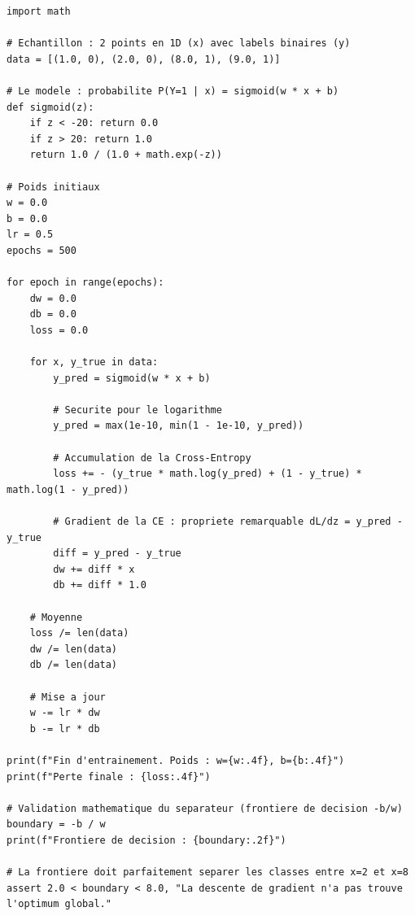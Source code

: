 \documentclass[11pt,a4paper]{article}
\begin{document}
\begin{lstlisting}
import math

# Echantillon : 2 points en 1D (x) avec labels binaires (y)
data = [(1.0, 0), (2.0, 0), (8.0, 1), (9.0, 1)]

# Le modele : probabilite P(Y=1 | x) = sigmoid(w * x + b)
def sigmoid(z):
    if z < -20: return 0.0
    if z > 20: return 1.0
    return 1.0 / (1.0 + math.exp(-z))

# Poids initiaux
w = 0.0
b = 0.0
lr = 0.5
epochs = 500

for epoch in range(epochs):
    dw = 0.0
    db = 0.0
    loss = 0.0

    for x, y_true in data:
        y_pred = sigmoid(w * x + b)

        # Securite pour le logarithme
        y_pred = max(1e-10, min(1 - 1e-10, y_pred))

        # Accumulation de la Cross-Entropy
        loss += - (y_true * math.log(y_pred) + (1 - y_true) * math.log(1 - y_pred))

        # Gradient de la CE : propriete remarquable dL/dz = y_pred - y_true
        diff = y_pred - y_true
        dw += diff * x
        db += diff * 1.0

    # Moyenne
    loss /= len(data)
    dw /= len(data)
    db /= len(data)

    # Mise a jour
    w -= lr * dw
    b -= lr * db

print(f"Fin d'entrainement. Poids : w={w:.4f}, b={b:.4f}")
print(f"Perte finale : {loss:.4f}")

# Validation mathematique du separateur (frontiere de decision -b/w)
boundary = -b / w
print(f"Frontiere de decision : {boundary:.2f}")

# La frontiere doit parfaitement separer les classes entre x=2 et x=8
assert 2.0 < boundary < 8.0, "La descente de gradient n'a pas trouve l'optimum global."
\end{lstlisting}
\end{document}
